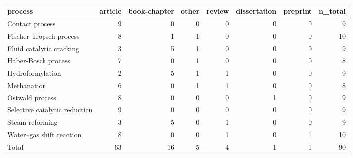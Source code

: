 \begin{tabular}{lrrrrrrr}
\toprule
process & article & book-chapter & other & review & dissertation & preprint & n\_total \\
\midrule
Contact process & 9 & 0 & 0 & 0 & 0 & 0 & 9 \\
Fischer-Tropsch process & 8 & 1 & 1 & 0 & 0 & 0 & 10 \\
Fluid catalytic cracking & 3 & 5 & 1 & 0 & 0 & 0 & 9 \\
Haber-Bosch process & 7 & 0 & 1 & 0 & 0 & 0 & 8 \\
Hydroformylation & 2 & 5 & 1 & 1 & 0 & 0 & 9 \\
Methanation & 6 & 0 & 1 & 1 & 0 & 0 & 8 \\
Ostwald process & 8 & 0 & 0 & 0 & 1 & 0 & 9 \\
Selective catalytic reduction & 9 & 0 & 0 & 0 & 0 & 0 & 9 \\
Steam reforming & 3 & 5 & 0 & 1 & 0 & 0 & 9 \\
Water–gas shift reaction & 8 & 0 & 0 & 1 & 0 & 1 & 10 \\
Total & 63 & 16 & 5 & 4 & 1 & 1 & 90 \\
\bottomrule
\end{tabular}
